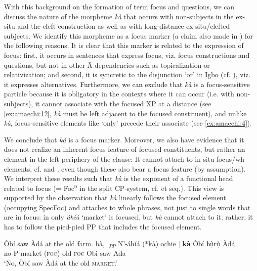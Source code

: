 \documentclass[output=paper,colorlinks,citecolor=brown]{langscibook}
\begin{document}
With this background on the formation of term focus and questions, we can discuss the nature of the morpheme \textit{k\`a} that occurs with non-subjects in the ex-situ and the cleft construction as well as with long-distance ex-situ\slash clefted subjects. We identify this morpheme as a focus marker (a claim also  made in \citealt{Osuagwu2015}) for the following reasons. It is clear that this marker is related to the expression of focus: first, it occurs in sentences that express focus, viz. focus constructions and questions, but not in other \=A-dependencies such as topicalization or relativization; and second, it is syncretic to the disjunction `or' in Igbo (cf. \citealt{Nwachukwu1987}), viz. it expresses alternatives. Furthermore, we can exclude that \textit{k\`a} is a focus-sensitive particle because it is obligatory in the contexts where it can occur (i.e. with non-subjects), it cannot associate with the focused XP at a distance (see \ref{ex:amaechi:12}, \textit{k\`a} must be left adjacent to the focused constituent), and unlike \textit{k\`a}, focus-sensitive elements like `only' precede their associate (see \ref{ex:amaechi:4}).

\z

We conclude that \textit{k\`a} is a focus marker. Moreover, we also have evidence that it does not realize an inherent focus feature of focused constituents, but rather an element in the left periphery of the clause:  It  cannot attach to in-situ focus\slash wh-elements, cf.  and , even though these also bear a focus feature (by assumption). We interpret these results such that \textit{k\`a} is the exponent of a functional head related to focus (= Foc$^{0}$ in the split CP-system, cf. \citealt{Rizzi1997} et seq.). This view is supported by the observation that \textit{k\`a} linearly follows the focused element (occupying SpecFoc) and attaches to whole phrases, not just to single words that are in focus: in  only \textit{áhíá} `market' is focused, but \textit{k\`a} cannot  attach to it; rather, it has to follow the pied-pied PP that includes the focused element.

\ea%
    \label{ex:amaechi:13}
    \ea\label{ex:amaechi:13a}
        Òbí saw Àdá at the old farm.
    \ex\label{ex:amaechi:13b}
        bà, [$_{PP}$ N'-áhíá (*kà) ochie ] \textbf{kà} {} Òbí hụ̀rụ̀ Àdá.\\
                no {} P-market (\textsc{foc}) old {} \textsc{foc} {} Obi saw Ada\\
        \glt    `No, Òbí saw Àdá at the {old} \textsc{market}.'%
    \z
\z
\end{document}
